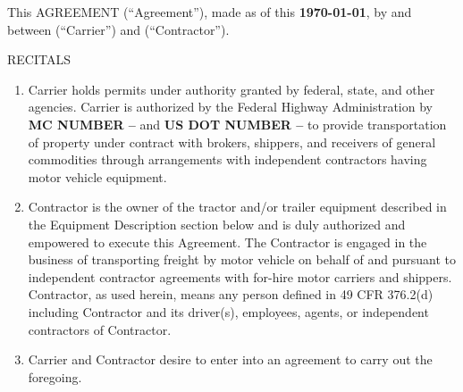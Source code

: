 \documentclass[11pt]{article}
\begin{document}
    \thispagestyle{firstpage}

    \maketitle

    \noindent%
    This AGREEMENT (``Agreement''), made as of this \textbf{\today}, by and
    between \textbf{\CarrierName} (``Carrier'') and {\xrfill[-1pt]{0.5pt}}
    (``Contractor'').

    \begin{center}
        RECITALS
    \end{center}
    \begin{enumerate}
        \item Carrier holds permits under authority granted by federal, state,
        and other agencies. Carrier is authorized by the Federal Highway
        Administration by {\textbf{MC NUMBER -- \CarrierMC}} and
        {\textbf{US DOT NUMBER -- \CarrierUSDOT}} to provide transportation
        of property under contract with brokers, shippers, and receivers of
        general commodities through arrangements with independent contractors
        having motor vehicle equipment.
        
        \item Contractor is the owner of the tractor and/or trailer equipment
        described in the Equipment Description section below and is duly
        authorized and empowered to execute this Agreement. The Contractor is
        engaged in the business of transporting freight by motor vehicle on
        behalf of and pursuant to independent contractor agreements with
        for-hire motor carriers and shippers. Contractor, as used herein, means
        any person defined in 49 CFR 376.2(d) including Contractor and its
        driver(s), employees, agents, or independent contractors of Contractor.

        \item Carrier and Contractor desire to enter into an agreement to carry
        out the foregoing.
    \end{enumerate}
\end{document}
